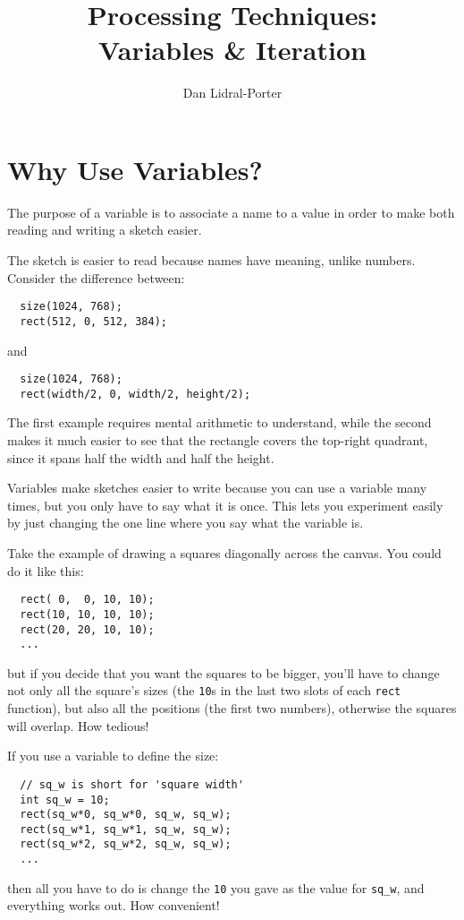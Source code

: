 \documentclass[
]{leaflet}
\title{\vspace{-2ex}Processing Techniques:\\
Variables \& Iteration\vspace{-2ex}}
\author{%
  Dan Lidral-Porter\vspace{-2ex}
}
\date{}
\begin{document}


\maketitle
\thispagestyle{empty}


\section{Why Use Variables?}

The purpose of a variable is to associate a name to a value in order to make both reading and writing a sketch easier.

The sketch is easier to read because names have meaning, unlike numbers.
Consider the difference between:
\begin{lstlisting}
  size(1024, 768);
  rect(512, 0, 512, 384);
\end{lstlisting}
\vspace{-0.5em}
and
\begin{lstlisting}
  size(1024, 768);
  rect(width/2, 0, width/2, height/2);
\end{lstlisting}
The first example requires mental arithmetic to understand, while the second makes it much easier to see that the rectangle covers the top-right quadrant, since it spans half the width and half the height.

Variables make sketches easier to write because you can use a variable many times, but you only have to say what it is once.
This lets you experiment easily by just changing the one line where you say what the variable is.

Take the example of drawing a squares diagonally across the canvas.
You could do it like this:
\begin{lstlisting}
  rect( 0,  0, 10, 10);
  rect(10, 10, 10, 10);
  rect(20, 20, 10, 10);
  ...
\end{lstlisting}
but if you decide that you want the squares to be bigger, you'll have to change not only all the square's sizes (the \texttt{10}s in the last two slots of each \texttt{rect} function), but also all the positions (the first two numbers), otherwise the squares will overlap.
How tedious!

If you use a variable to define the size:
\begin{lstlisting}
  // sq_w is short for 'square width'
  int sq_w = 10;
  rect(sq_w*0, sq_w*0, sq_w, sq_w);
  rect(sq_w*1, sq_w*1, sq_w, sq_w);
  rect(sq_w*2, sq_w*2, sq_w, sq_w);
  ...
\end{lstlisting}
then all you have to do is change the \texttt{10} you gave as the value for \texttt{sq\_w}, and everything works out.
How convenient!
\vspace{-1.5em}
\end{document}
